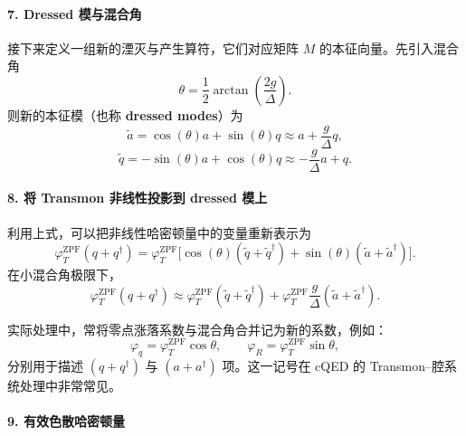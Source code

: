 \documentclass[12pt,a4paper,oneside]{ctexbook}
\begin{document}
\paragraph{7. Dressed 模与混合角}

接下来定义一组新的湮灭与产生算符，它们对应矩阵 \(M\) 的本征向量。先引入混合角
\[
    \theta=\frac{1}{2}\arctan\!\left(\frac{2g}{\Delta}\right).
\]
则新的本征模（也称 \textbf{dressed modes}）为
\begin{equation}
    \tilde a
    =
    \cos(\theta)a+\sin(\theta)q
    \approx
    a+\frac{g}{\Delta}q,
    \tag{30}
\end{equation}
\begin{equation}
    \tilde q
    =
    -\sin(\theta)a+\cos(\theta)q
    \approx
    -\frac{g}{\Delta}a+q.
    \tag{31}
\end{equation}

\paragraph{8. 将 Transmon 非线性投影到 dressed 模上}

利用上式，可以把非线性哈密顿量中的变量重新表示为
\[
    \varphi_T^{\mathrm{ZPF}}(q+q^\dagger)
    =
    \varphi_T^{\mathrm{ZPF}}
    \big[
        \cos(\theta)(\tilde q+\tilde q^\dagger)
        +
        \sin(\theta)(\tilde a+\tilde a^\dagger)
    \big].
\]
在小混合角极限下，
\begin{equation}
    \varphi_T^{\mathrm{ZPF}}(q+q^\dagger)
    \approx
    \varphi_T^{\mathrm{ZPF}}(\tilde q+\tilde q^\dagger)
    +
    \varphi_T^{\mathrm{ZPF}}\frac{g}{\Delta}(\tilde a+\tilde a^\dagger).
    \tag{32}
\end{equation}

实际处理中，常将零点涨落系数与混合角合并记为新的系数，例如：
\[
    \varphi_q=\varphi_T^{\mathrm{ZPF}}\cos\theta,
    \qquad
    \varphi_R=\varphi_T^{\mathrm{ZPF}}\sin\theta,
\]
分别用于描述 \((q+q^\dagger)\) 与 \((a+a^\dagger)\) 项。这一记号在 cQED 的 Transmon--腔系统处理中非常常见。

\paragraph{9. 有效色散哈密顿量}
\end{document}

